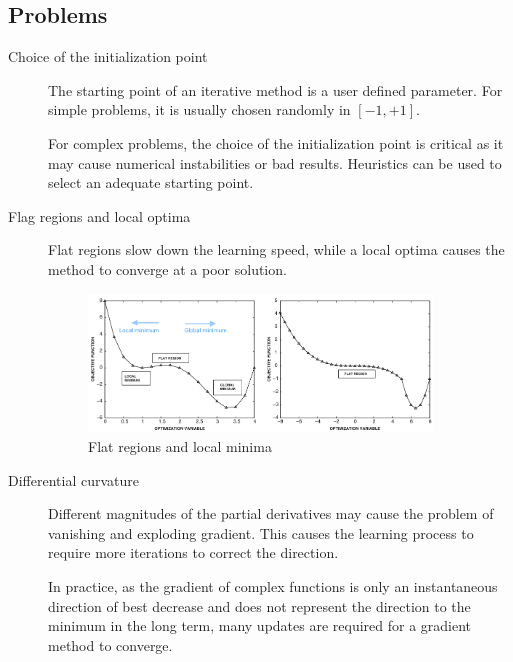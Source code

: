 \subsection{Problems}

\begin{description}
    \item[Choice of the initialization point] 
        The starting point of an iterative method is a user defined parameter.
        For simple problems, it is usually chosen randomly in $[-1, +1]$.
        
        For complex problems, the choice of the initialization point is critical as 
        it may cause numerical instabilities or bad results.
        Heuristics can be used to select an adequate starting point.

    \item[Flag regions and local optima] 
        Flat regions slow down the learning speed,
        while a local optima causes the method to converge at a poor solution.
        \begin{figure}[ht]
            \centering
            \includegraphics[width=0.9\textwidth]{img/_descent_local_flat.pdf}
            \caption{Flat regions and local minima}
        \end{figure}
    
    \item[Differential curvature]
        Different magnitudes of the partial derivatives may cause the problem of
        vanishing and exploding gradient. 
        This causes the learning process to require more iterations to correct the direction.

        In practice, as the gradient of complex functions is only an instantaneous direction of best decrease and
        does not represent the direction to the minimum in the long term, 
        many updates are required for a gradient method to converge.


\end{description}
